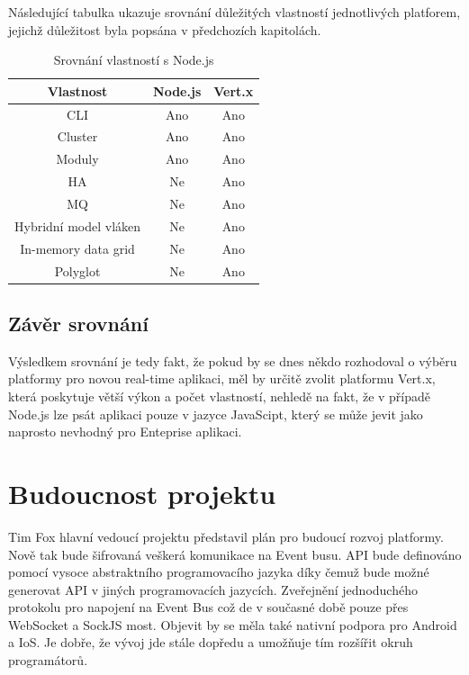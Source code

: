 Následující tabulka ukazuje srovnání důležitých vlastností jednotlivých platforem, jejichž důležitost byla popsána v předchozích kapitolách.
\begin{table}[h]
\centering
\caption{Srovnání vlastností s Node.js}
\begin{tabular}{ |c|c|c| }
\hline
\textsf{\textbf{Vlastnost}} & \textsf{\textbf{Node.js}} & \textsf{\textbf{Vert.x}}\tabularnewline
\hline
CLI & Ano & Ano\tabularnewline
\hline 
Cluster & Ano & Ano\tabularnewline
\hline
Moduly & Ano & Ano\tabularnewline
\hline 
HA & Ne & Ano\tabularnewline
\hline
MQ & Ne & Ano\tabularnewline
\hline 
Hybridní model vláken & Ne & Ano\tabularnewline
\hline 
In-memory data grid & Ne & Ano\tabularnewline
\hline 
Polyglot & Ne & Ano\tabularnewline
\hline
\end{tabular}
\end{table}

\subsection{Závěr srovnání}

Výsledkem srovnání je tedy fakt, že pokud by se dnes někdo rozhodoval o výběru platformy pro novou real-time aplikaci, měl by určitě zvolit platformu Vert.x, která poskytuje větší výkon a počet vlastností, nehledě na fakt, že v případě Node.js lze psát aplikaci pouze v jazyce JavaScipt, který se může jevit jako naprosto nevhodný pro Enteprise aplikaci.

\section{Budoucnost projektu}

Tim Fox hlavní vedoucí projektu představil plán \cite{plan} pro budoucí rozvoj platformy. Nově tak bude šifrovaná veškerá komunikace na Event busu. API bude definováno pomocí vysoce abstraktního programovacího jazyka díky čemuž bude možné generovat API v jiných programovacích jazycích. Zveřejnění jednoduchého protokolu pro napojení na Event Bus což de v současné době pouze přes WebSocket a SockJS most. Objevit by se měla také nativní podpora pro Android a IoS. Je dobře, že vývoj jde stále dopředu a umožňuje tím rozšířit okruh programátorů.